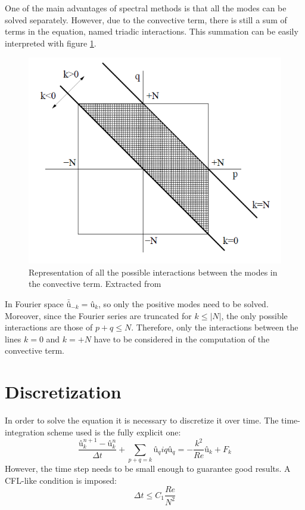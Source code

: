 One of the main advantages of spectral methods is that all the modes can be solved separately. However, due to the convective term, there is still a sum of terms in the equation, named triadic interactions. This summation can be easily interpreted with figure \ref{TriadicFigure}.
\begin{figure}
	\centering
	\includegraphics[scale=0.7]{Burgers/Burger}
	\caption[Representation of all the possible interactions between the modes in the convective term]{Representation of all the possible interactions between the modes in the convective term. Extracted from \cite{CTTC2014}}
	\label{TriadicFigure}
\end{figure}
In Fourier space $\bar{û}_{-k}=û_{k}$, so only the positive modes need to be solved. Moreover, since the Fourier series are truncated for $k\leq|N|$, the only possible interactions are those of $p+q\leq N$. Therefore, only the interactions between the lines $k=0$ and $k=+N$ have to be considered in the computation of the convective term.

\section{Discretization}
In order to solve the equation it is necessary to discretize it over time. The time-integration scheme used is the fully explicit one:
\begin{equation}
\frac{û_{k}^{n+1}-û_{k}^{n}}{\Delta t}+\sum_{p+q=k}û_{q}iqû_{q}=-\frac{k^{2}}{Re}û_{k}+F_{k}
\label{DiscretizedBurgers}
\end{equation}
However, the time step needs to be small enough to guarantee good results. A CFL-like condition is imposed:
\begin{equation}
\Delta t\leq C_{1}\frac{Re}{N^{2}}
\end{equation}

